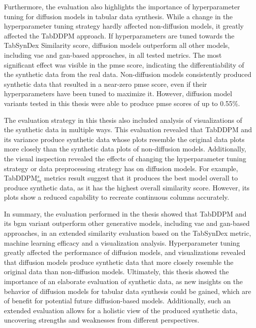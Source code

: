 Furthermore, the evaluation also highlights the importance of hyperparameter tuning for diffusion models in tabular data synthesis.
While a change in the hyperparameter tuning strategy hardly affected non-diffusion models, it greatly affected the TabDDPM approach.
If hyperparameters are tuned towards the TabSynDex Similarity score, diffusion models outperform all other models, including \gls{vae} and \gls{gan}-based approaches,
in all tested metrics.
The most significant effect was visible in the \gls{pmse} score, indicating the differentiability of the synthetic data from the real data.
Non-diffusion models consistently produced synthetic data that resulted in a near-zero \gls{pmse} score, even if their hyperparameters have been tuned to maximize it.
However, diffusion model variants tested in this thesis were able to produce \gls{pmse} scores of up to 0.55\%.

The evaluation strategy in this thesis also included analysis of visualizations of the synthetic data in multiple ways.
This evaluation revealed that TabDDPM and its variance produce synthetic data whose plots resemble the original data plots more closely than the synthetic data plots of non-diffusion models.
Additionally, the visual inspection revealed the effects of changing the hyperparameter tuning strategy or data preprocessing strategy has on diffusion models.
For example, TabDDPM$^{s}_m$ metrics result suggest that it produces the best model overall to produce synthetic data, as it has the highest overall similarity score.
However, its plots show a reduced capability to recreate continuous columns accurately.

In summary, the evaluation performed in the thesis showed that TabDDPM and its \gls{bgm} variant outperform other generative models,
including \gls{vae} and \gls{gan}-based approaches, in an extended similarity evaluation based on the TabSynDex metric,
machine learning efficacy and a visualization analysis.
Hyperparameter tuning greatly affected the performance of diffusion models, and visualizations revealed that diffusion models produce synthetic data that more closely resemble the original data than non-diffusion models.
Ultimately, this thesis showed the importance of an elaborate evaluation of synthetic data, as new insights on the behavior of diffusion models for tabular data synthesis could be gained,
which are of benefit for potential future diffusion-based models.
Additionally, such an extended evaluation allows for a holistic view of the produced synthetic data, uncovering strengths and weaknesses from different perspectives.


